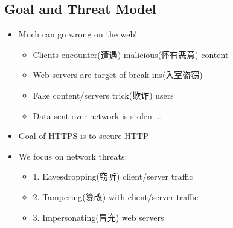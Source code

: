 \documentclass[12pt]{ctexart}   %
\begin{document}
	\subsection{Goal and Threat Model}
	\begin{itemize}
		\item Much can go wrong on the web!
		\begin{itemize}
			\item Clients encounter(遭遇) malicious(怀有恶意) content
			\item Web servers are target of break-ins(入室盗窃)
			\item Fake content/servers trick(欺诈) users
			\item Data sent over network is stolen ...
		\end{itemize}
		
		\item Goal of HTTPS is to secure HTTP
		\item We focus on network threats:
		\begin{itemize}
			\item {\color{blue} 1.} Eavesdropping(窃听) client/server traffic
			\item {\color{blue} 2.} Tampering(篡改) with client/server traffic
			\item {\color{blue} 3.} Impersonating(冒充) web servers
		\end{itemize}
	\end{itemize}
\end{document}
